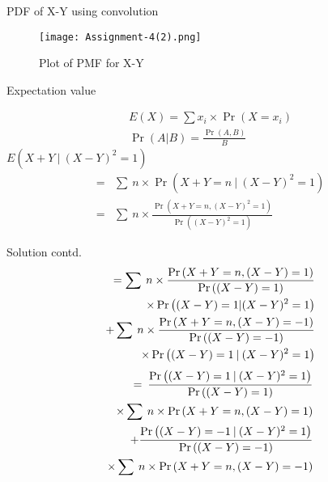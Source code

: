 \documentclass{beamer}
\providecommand{\brak}[1]{\ensuremath{\left(#1\right)}}
\begin{document}
\begin{frame}{PDF of X-Y using convolution}
    \begin{figure}[htb]
        \texttt{[image: Assignment-4(2).png]}
        \caption{Plot of PMF for X-Y}
    \end{figure}
\end{frame}

\begin{frame}{Expectation value}
    \begin{block}
        \begin{align}
            E\brak{X}=\sum x_{i}\times\Pr\brak{X=x_{i}}\\
            \Pr\brak{A|B}=\frac{\Pr\brak{A,B}}{{B}}
        \end{align}
        $E\brak{X+Y\:|\:(X-Y)^2=1}$
        \begin{align}
            =&\sum\:n\times\Pr\brak{X+Y=n\:|\:(X-Y)^2=1}\\
            =&\sum\:n\times\frac{\Pr\brak{X+Y=n,(X-Y)^2=1}}{\Pr\brak{(X-Y)^2=1}}
        \end{align}
    \end{block}
\end{frame}

\begin{frame}{Solution contd.}
    \begin{align}
        \begin{split}
            =\sum\:n\times\frac{\Pr\brak{X+Y=n,(X-Y)=1}}{\Pr\brak{(X-Y)=1}}
            \bigskip\\
            \times\Pr\brak{(X-Y)=1|(X-Y)^2=1}
            \bigskip\\
            +\sum\:n\times\frac{\Pr\brak{X+Y=n,(X-Y)=-1}}{\Pr\brak{(X-Y)=-1}}
            \bigskip\\
            \times\Pr\brak{(X-Y)=1\:|\:(X-Y)^2=1}
        \end{split}
    \end{align}
    \begin{align}
        \begin{split}
            =\:\frac{\Pr\brak{(X-Y)=1\:|\:(X-Y)^2=1}}{\Pr\brak{(X-Y)=1}}
            \bigskip\\
            \times\sum\:n\times\Pr\brak{X+Y=n,(X-Y)=1}
            \bigskip\\
            +\frac{\Pr\brak{(X-Y)=-1\:|\:(X-Y)^2=1}}{\Pr\brak{(X-Y)=-1}}
            \bigskip\\
            \times\sum\:n\times\Pr\brak{X+Y=n,(X-Y)=-1}\label{0.0.8}
        \end{split}
    \end{align}
\end{frame}
\end{document}
